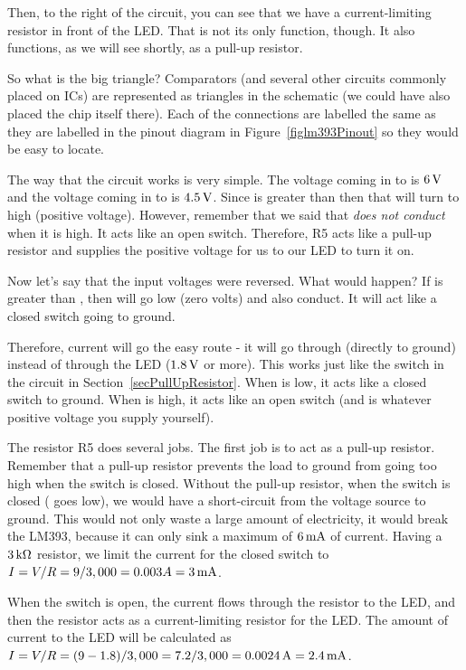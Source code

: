 Then, to the right of the circuit, you can see that we have a current-limiting resistor in front of the LED.
That is not its only function, though.
It also functions, as we will see shortly, as a pull-up resistor.

So what is the big triangle?
Comparators (and several other circuits commonly placed on ICs) are represented as triangles in the schematic (we could have also placed the chip itself there).
Each of the connections are labelled the same as they are labelled in the pinout diagram in Figure~\ref{figlm393Pinout} so they would be easy to locate.

The way that the circuit works is very simple.
The voltage coming in to  is $6\,\si{\volt}$ and the voltage coming in to  is $4.5\,\si{\volt}$.
Since  is greater than  then that will turn  to high (positive voltage).
However, remember that we said that  \emph{does not conduct} when it is high.
It acts like an open switch.
Therefore, R5 acts like a pull-up resistor and supplies the positive voltage for us to our LED to turn it on.

Now let's say that the input voltages were reversed.
What would happen?
If  is greater than , then  will go low (zero volts) and also conduct.
It will act like a closed switch going to ground.

Therefore, current will go the easy route - it will go through  (directly to ground) instead of through the LED ($1.8\,\si{\volt}$ or more).
This works just like the switch in the circuit in Section~\ref{secPullUpResistor}.
When  is low, it acts like a closed switch to ground.
When  is high, it acts like an open switch (and is whatever positive voltage you supply yourself).

The resistor R5 does several jobs.
The first job is to act as a pull-up resistor. 
Remember that a pull-up resistor prevents the load to ground from going too high when the switch is closed.
Without the pull-up resistor, when the switch is closed ( goes low), we would have a short-circuit from the voltage source to ground.
This would not only waste a large amount of electricity, it would break the LM393, because it can only sink a maximum of $6\,\si{\milli\ampere}$ of current.
Having a $3\,\si{\kilo\ohm}$ resistor, we limit the current for the closed switch to $I = V / R = 9 / 3,000 = 0.003A = 3\,\si{\milli\ampere} $.

When the switch is open, the current flows through the resistor to the LED, and then the resistor acts as a current-limiting resistor for the LED.
The amount of current to the LED will be calculated as $I = V / R = (9 - 1.8) / 3,000 = 7.2 / 3,000 = 0.0024\,\si{\ampere} = 2.4\,\si{\milli\ampere}$.

